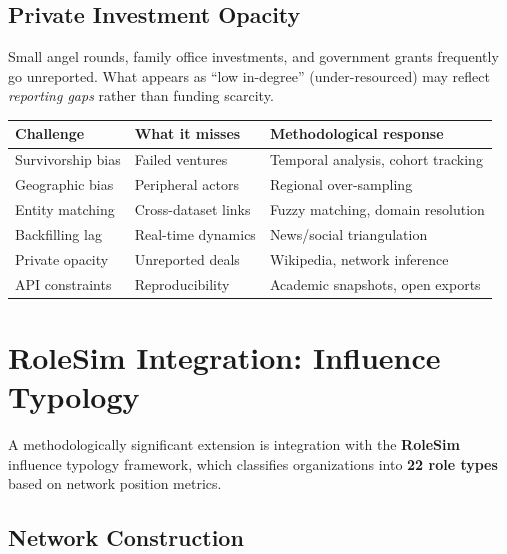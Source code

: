 \documentclass[../main.tex]{subfiles}
\begin{document}
\subsection{Private Investment Opacity}

Small angel rounds, family office investments, and government grants
frequently go unreported.
What appears as ``low in-degree'' (under-resourced) may reflect
\emph{reporting gaps} rather than funding scarcity.

\tableminimal
\begin{center}
\begin{tabular}{@{}p{3cm}p{4cm}p{4cm}@{}}
\toprule
\textbf{Challenge} & \textbf{What it misses} & \textbf{Methodological response} \\
\midrule
Survivorship bias & Failed ventures & Temporal analysis, cohort tracking \\
Geographic bias & Peripheral actors & Regional over-sampling \\
Entity matching & Cross-dataset links & Fuzzy matching, domain resolution \\
Backfilling lag & Real-time dynamics & News/social triangulation \\
Private opacity & Unreported deals & Wikipedia, network inference \\
API constraints & Reproducibility & Academic snapshots, open exports \\
\bottomrule
\end{tabular}
\end{center}


\section{RoleSim Integration: Influence Typology}
\label{sec:crunchbase-rolesim}

A methodologically significant extension is integration with the
\textbf{RoleSim} influence typology framework, which classifies
organizations into \textbf{22 role types} based on network position metrics.

\subsection{Network Construction}
\end{document}
